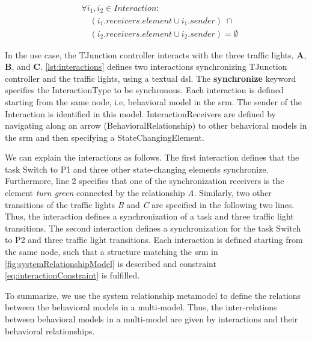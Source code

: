 \documentclass{jot}
\begin{document}
\begin{equation} \label{eq:noOverlap}
    \begin{aligned}
    & \forall i_1,i_2 \in Interaction : \\
    & \quad (i_1.receivers.element \cup i_1.sender) \; \cap \\
    & \quad (i_2.receivers.element \cup i_2.sender) = \emptyset
    \end{aligned}
\end{equation}

In the use case, the TJunction controller interacts with the three traffic lights, \textbf{A}, \textbf{B}, and \textbf{C}.
\autoref{lst:interactions} defines two interactions synchronizing TJunction controller and the traffic lights, using a textual \gls*{dsl}.
The \textbf{synchronize} keyword specifies the \textsf{InteractionType} to be \textsf{synchronous}.
Each interaction is defined starting from the same node, i.e, behavioral model in the \gls*{srm}.
The \textsf{sender} of the \textsf{Interaction} is identified in this model. 
\textsf{InteractionReceiver}s are defined by navigating along an arrow (\textsf{BehavioralRelationship}) to other behavioral models in the \gls*{srm} and then specifying a \textsf{StateChangingElement}.



We can explain the interactions as follows.
The first interaction defines that the task \textsf{Switch to P1} and three other state-changing elements synchronize.
Furthermore, line 2 specifies that one of the synchronization receivers is the element \emph{turn green} connected by the relationship \emph{A}.
Similarly, two other transitions of the traffic lights \emph{B} and \emph{C} are specified in the following two lines.
Thus, the interaction defines a synchronization of a task and three traffic light transitions. 
The second interaction defines a synchronization for the task \textsf{Switch to P2} and three traffic light transitions.
Each interaction is defined starting from the same node, such that a structure matching the \gls*{srm} in \autoref{fig:systemRelationshipModel} is described and constraint \eqref{eq:interactionConstraint} is fulfilled.

To summarize, we use the system relationship metamodel to define the relations between the behavioral models in a multi-model.
Thus, the inter-relations between behavioral models in a multi-model are given by interactions and their behavioral relationships.
\end{document}
